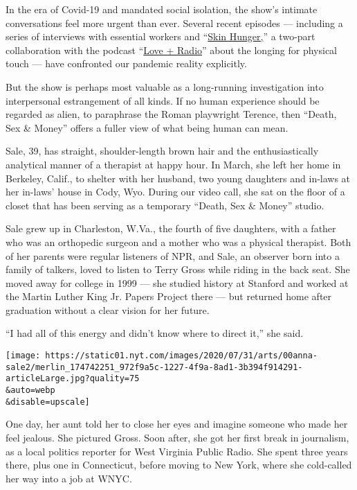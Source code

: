 In the era of Covid-19 and mandated social isolation, the show's
intimate conversations feel more urgent than ever. Several recent
episodes --- including a series of interviews with essential workers and
``\href{https://www.wnycstudios.org/podcasts/deathsexmoney/episodes/skin-hunger-love-radio-part-1}{Skin
Hunger,}'' a two-part collaboration with the podcast
``\href{https://loveandradio.org/}{Love + Radio}'' about the longing for
physical touch --- have confronted our pandemic reality explicitly.

But the show is perhaps most valuable as a long-running investigation
into interpersonal estrangement of all kinds. If no human experience
should be regarded as alien, to paraphrase the Roman playwright Terence,
then ``Death, Sex \& Money'' offers a fuller view of what being human
can mean.

Sale, 39, has straight, shoulder-length brown hair and the
enthusiastically analytical manner of a therapist at happy hour. In
March, she left her home in Berkeley, Calif., to shelter with her
husband, two young daughters and in-laws at her in-laws' house in Cody,
Wyo. During our video call, she sat on the floor of a closet that has
been serving as a temporary ``Death, Sex \& Money'' studio.

Sale grew up in Charleston, W.Va., the fourth of five daughters, with a
father who was an orthopedic surgeon and a mother who was a physical
therapist. Both of her parents were regular listeners of NPR, and Sale,
an observer born into a family of talkers, loved to listen to Terry
Gross while riding in the back seat. She moved away for college in 1999
--- she studied history at Stanford and worked at the Martin Luther King
Jr. Papers Project there --- but returned home after graduation without
a clear vision for her future.

``I had all of this energy and didn't know where to direct it,'' she
said.

\texttt{[image: https://static01.nyt.com/images/2020/07/31/arts/00anna-sale2/merlin\_174742251\_972f9a5c-1227-4f9a-8ad1-3b394f914291-articleLarge.jpg?quality=75\\\&auto=webp\\\&disable=upscale]}

One day, her aunt told her to close her eyes and imagine someone who
made her feel jealous. She pictured Gross. Soon after, she got her first
break in journalism, as a local politics reporter for West Virginia
Public Radio. She spent three years there, plus one in Connecticut,
before moving to New York, where she cold-called her way into a job at
WNYC.

